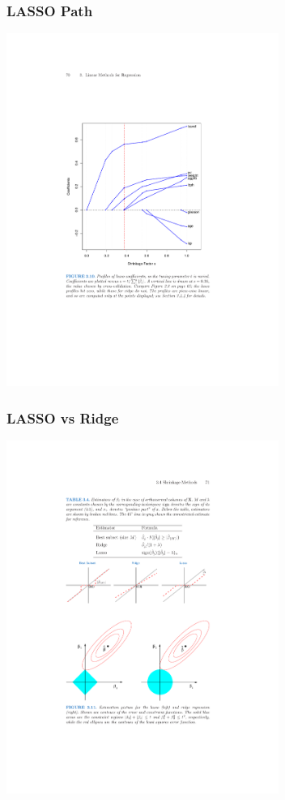 \begin{frame}
\frametitle{LASSO Path}
\begin{center}
\includegraphics[width=3.5in]{./resources/lassopath}
\end{center}
\end{frame}

\begin{frame}
\frametitle{LASSO vs Ridge}
\begin{center}
\includegraphics[width=3.5in]{./resources/geometry}
\end{center}
\end{frame}

